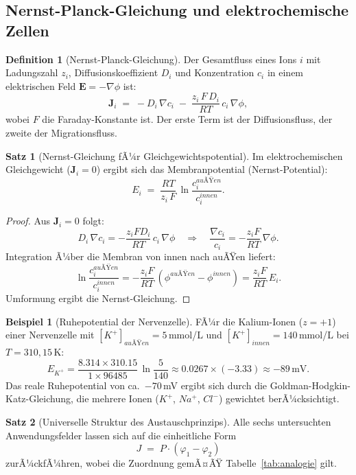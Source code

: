 ﻿\documentclass[a4paper,12pt]{article}
\theoremstyle{definition}
\newtheorem{definition}{Definition}
\newtheorem{beispiel}{Beispiel}
\newtheorem{satz}{Satz}
\begin{document}
\subsection{Nernst-Planck-Gleichung und elektrochemische Zellen}

\begin{definition}[Nernst-Planck-Gleichung]
    Der Gesamtfluss eines Ions $i$ mit Ladungszahl $z_i$, Diffusionskoeffizient $D_i$
    und Konzentration $c_i$ in einem elektrischen Feld $\mathbf{E} = -\nabla\phi$ ist:
    \[
        \mathbf{J}_i \;=\; -D_i\,\nabla c_i
        \;-\; \frac{z_i\,F\,D_i}{RT}\,c_i\,\nabla\phi,
    \]
    wobei $F$ die Faraday-Konstante ist. Der erste Term ist der Diffusionsfluss,
    der zweite der Migrationsfluss.
\end{definition}

\begin{satz}[Nernst-Gleichung fÃ¼r Gleichgewichtspotential]
    Im elektrochemischen Gleichgewicht ($\mathbf{J}_i = 0$) ergibt sich das
    Membranpotential (Nernst-Potential):
    \[
        E_i \;=\; \frac{RT}{z_i\,F}\,\ln\frac{c_i^{auÃŸen}}{c_i^{innen}}.
    \]
\end{satz}

\begin{proof}
    Aus $\mathbf{J}_i = 0$ folgt:
    \[
        D_i\,\nabla c_i = -\frac{z_i F D_i}{RT}\,c_i\,\nabla\phi
        \quad\Rightarrow\quad
        \frac{\nabla c_i}{c_i} = -\frac{z_i F}{RT}\,\nabla\phi.
    \]
    Integration Ã¼ber die Membran von innen nach auÃŸen liefert:
    \[
        \ln\frac{c_i^{auÃŸen}}{c_i^{innen}} = -\frac{z_i F}{RT}\,(\phi^{auÃŸen} - \phi^{innen})
        = \frac{z_i F}{RT}\,E_i.
    \]
    Umformung ergibt die Nernst-Gleichung. \qedhere
\end{proof}

\begin{beispiel}[Ruhepotential der Nervenzelle]
    FÃ¼r die Kalium-Ionen ($z = +1$) einer Nervenzelle mit
    $[K^+]_{auÃŸen} = 5$\,mmol/L und $[K^+]_{innen} = 140$\,mmol/L
    bei $T = 310{,}15$\,K:
    \[
        E_{K^+} = \frac{8.314 \times 310.15}{1 \times 96485}\,
        \ln\frac{5}{140}
        \approx 0.0267 \times (-3.33)
        \approx -89\,\mathrm{mV}.
    \]
    Das reale Ruhepotential von ca.\ $-70$\,mV ergibt sich durch die
    Goldman-Hodgkin-Katz-Gleichung, die mehrere Ionen ($K^+$, $Na^+$, $Cl^-$)
    gewichtet berÃ¼cksichtigt.
\end{beispiel}

\begin{satz}[Universelle Struktur des Austauschprinzips]
    Alle sechs untersuchten Anwendungsfelder lassen sich auf die einheitliche Form
    \[
        J \;=\; P \cdot (\varphi_1 - \varphi_2)
    \]
    zurÃ¼ckfÃ¼hren, wobei die Zuordnung gemÃ¤ÃŸ Tabelle~\ref{tab:analogie} gilt.
\end{satz}
\end{document}
